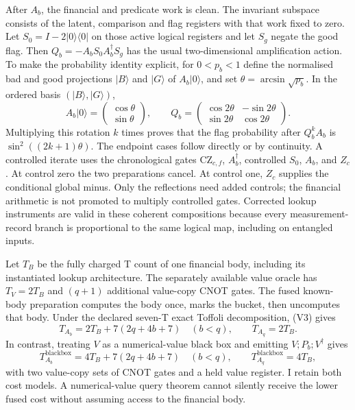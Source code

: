 After \(A_b\), the financial and predicate work is clean. The invariant
subspace consists of the latent, comparison and flag registers with that
work fixed to zero. Let \(S_0=I-2\lvert0\rangle\langle0\rvert\)
on those active logical registers and let \(S_g\) negate the good flag.
Then \(Q_b=-A_b S_0 A_b^\dagger S_g\) has the usual two-dimensional
amplification action. To make the probability identity explicit, for
\(0<p_b<1\) define the normalised bad and good projections
\(\lvert B\rangle\) and \(\lvert G\rangle\) of
\(A_b\lvert0\rangle\), and set
\(\theta=\arcsin\sqrt{p_b}\). In the ordered basis
\((\lvert B\rangle,\lvert G\rangle)\),
\[
 A_b\lvert0\rangle=
 \begin{pmatrix}\cos\theta\\\sin\theta\end{pmatrix},
 \qquad
 Q_b=\begin{pmatrix}\cos2\theta&-\sin2\theta\\
                    \sin2\theta& \cos2\theta\end{pmatrix}.
\]
Multiplying this rotation \(k\) times proves that the flag probability
after \(Q_b^kA_b\) is \(\sin^2((2k+1)\theta)\).
The endpoint cases follow directly or by continuity. A controlled iterate
uses the chronological gates
\(\mathrm{CZ}_{c,f}\), \(A_b^\dagger\), controlled \(S_0\),
\(A_b\), and \(Z_c\). At control zero the two preparations cancel.
At control one, \(Z_c\) supplies the conditional global minus. Only the
reflections need added controls; the financial arithmetic is not promoted
to multiply controlled gates. Corrected lookup instruments are valid in
these coherent compositions because every measurement-record branch is
proportional to the same logical map, including on entangled inputs.

Let \(T_B\) be the fully charged T count of one financial body, including
its instantiated lookup architecture. The separately available value oracle
has \(T_V=2T_B\) and \((q+1)\) additional value-copy CNOT gates.
The fused known-body preparation computes the body once, marks the bucket,
then uncomputes that body. Under the declared seven-T exact Toffoli
decomposition, (V3) gives
\[
 T_{A_b}=2T_B+7(2q+4b+7)\quad(b<q),\qquad T_{A_q}=2T_B.     \tag{V6}
\]
In contrast, treating \(V\) as a numerical-value black box and emitting
\(V;P_b;V^\dagger\) gives
\[
 T_{A_b}^{\mathrm{blackbox}}=4T_B+7(2q+4b+7)\quad(b<q),
 \qquad T_{A_q}^{\mathrm{blackbox}}=4T_B,                    \tag{V7}
\]
with two value-copy sets of CNOT gates and a held value register.
I retain both cost models. A numerical-value query theorem cannot silently
receive the lower fused cost without assuming access to the financial body.

